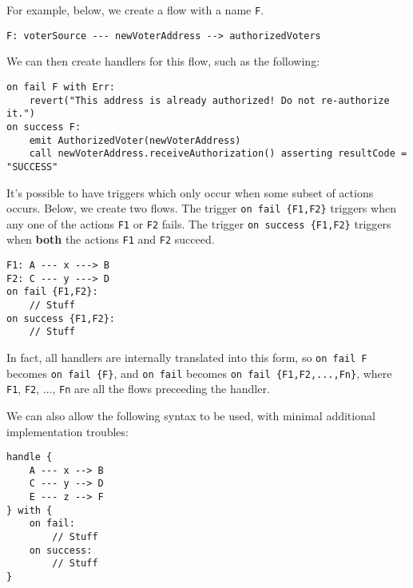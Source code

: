 \documentclass[10pt]{article}
\begin{document}

For example, below, we create a flow with a name \lstinline{F}.
\begin{lstlisting}
F: voterSource --- newVoterAddress --> authorizedVoters
\end{lstlisting}

We can then create handlers for this flow, such as the following:
\begin{lstlisting}
on fail F with Err:
    revert("This address is already authorized! Do not re-authorize it.")
on success F:
    emit AuthorizedVoter(newVoterAddress)
    call newVoterAddress.receiveAuthorization() asserting resultCode = "SUCCESS"
\end{lstlisting}

It's possible to have triggers which only occur when some subset of actions occurs.
Below, we create two flows.
The trigger \lstinline|on fail {F1,F2}| triggers when any one of the actions \lstinline{F1} or \lstinline{F2} fails.
The trigger \lstinline|on success {F1,F2}| triggers when \textbf{both} the actions \lstinline{F1} and \lstinline{F2} succeed.
\begin{lstlisting}
F1: A --- x ---> B
F2: C --- y ---> D
on fail {F1,F2}:
    // Stuff
on success {F1,F2}:
    // Stuff
\end{lstlisting}

In fact, all handlers are internally translated into this form, so \lstinline{on fail F} becomes \lstinline|on fail {F}|, and \lstinline{on fail} becomes \lstinline|on fail {F1,F2,...,Fn}|, where \lstinline{F1}, \lstinline{F2}, ..., \lstinline{Fn} are all the flows preceeding the handler.

We can also allow the following syntax to be used, with minimal additional implementation troubles:
\begin{lstlisting}
handle {
    A --- x --> B
    C --- y --> D
    E --- z --> F
} with {
    on fail:
        // Stuff
    on success:
        // Stuff
}
\end{lstlisting}
\end{document}
